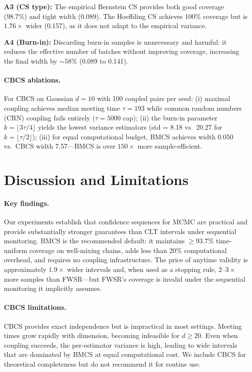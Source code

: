 \documentclass[11pt]{article}
\begin{document}
\textbf{A3 (CS type):} The empirical Bernstein CS provides both good coverage (98.7\%) and tight width (0.089). The Hoeffding CS achieves 100\% coverage but is $1.76\times$ wider (0.157), as it does not adapt to the empirical variance.

\textbf{A4 (Burn-in):} Discarding burn-in samples is unnecessary and harmful: it reduces the effective number of batches without improving coverage, increasing the final width by $\sim 58\%$ (0.089 to 0.141).

\paragraph{CBCS ablations.} For CBCS on Gaussian $d=10$ with 100 coupled pairs per seed: (i) maximal coupling achieves median meeting time $\tau = 193$ while common random numbers (CRN) coupling fails entirely ($\tau = 5000$ cap); (ii) the burn-in parameter $k = \lfloor 3\tau/4 \rfloor$ yields the lowest variance estimators (std = 8.18 vs.\ 20.27 for $k = \lfloor \tau/2 \rfloor$); (iii) for equal computational budget, BMCS achieves width 0.050 vs.\ CBCS width 7.57---BMCS is over $150\times$ more sample-efficient.

\section{Discussion and Limitations}
\label{sec:discussion}

\paragraph{Key findings.} Our experiments establish that confidence sequences for MCMC are practical and provide substantially stronger guarantees than CLT intervals under sequential monitoring. BMCS is the recommended default: it maintains $\geq 93.7\%$ time-uniform coverage on well-mixing chains, adds less than 20\% computational overhead, and requires no coupling infrastructure. The price of anytime validity is approximately $1.9\times$ wider intervals and, when used as a stopping rule, $2$--$3\times$ more samples than FWSR---but FWSR's coverage is invalid under the sequential monitoring it implicitly assumes.

\paragraph{CBCS limitations.} CBCS provides exact independence but is impractical in most settings. Meeting times grow rapidly with dimension, becoming infeasible for $d \geq 20$. Even when coupling succeeds, the per-estimator variance is high, leading to wide intervals that are dominated by BMCS at equal computational cost. We include CBCS for theoretical completeness but do not recommend it for routine use.
\end{document}
